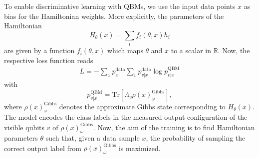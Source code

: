 \documentclass[twocolumn, aps, pra, superscriptaddress, floatfix]{revtex4}
\begin{document}
To enable discriminative learning with QBMs, we use the input data points $x$ as bias for the Hamiltonian weights. More explicitly, the parameters of the Hamiltonian
\begin{equation}
    H_{\theta}\left(x\right)=\sum\limits_{i}f_i\left(\theta, x\right)h_i
\end{equation}
are given by a function $f_i\left(\theta, x\right)$ which maps $\theta$ and $x$ to a scalar in $\mathbb{R}$.
Now, the respective loss function reads
\begin{equation*}
\label{eq:loss_sup}
\begin{split}
	L = -\sum\limits_{x}p_x^{\text{data}}\sum\limits_{v}p_{v|x}^{\text{data}}\log{p_{v|x}^{\text{QBM}}}
\end{split}
\end{equation*}
with
\begin{equation*}
   p_{v|x}^{\text{QBM}} = \text{Tr}\left[\Lambda_v\rho\left(x\right)_{\omega}^{\text{Gibbs}}\right],
\end{equation*}
where $\rho\left(x\right)_{\omega}^{\text{Gibbs}}$ denotes the approximate Gibbs state corresponding to $H_{\theta}\left(x\right)$.
The model encodes the class labels in the measured output configuration of the visible qubits $v$ of $\rho\left(x\right)_{\omega}^{\text{Gibbs}}$.
Now, the aim of the training is to find Hamiltonian parameters $\theta$ such that, given a data sample $x$, the probability of sampling the correct output label from $\rho\left(x\right)_{\omega}^{\text{Gibbs}}$ is maximized.
\end{document}
